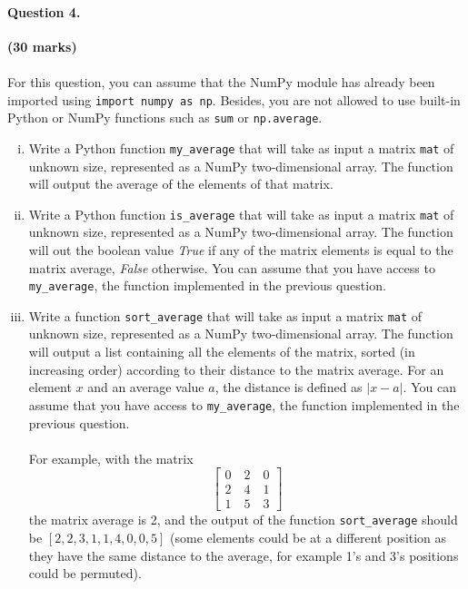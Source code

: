 \documentclass[12pt]{article}
\begin{document}
\paragraph{Question 4. }\hfill {\bf (30 marks)}\\\\
For this question, you can assume that the NumPy module has already been imported using \verb|import numpy as np|. Besides, you are not allowed to use built-in Python or NumPy functions such as \verb|sum| or \verb|np.average|.
\begin{enumerate}[(i)]
\item Write a Python function \verb|my_average| that will take as input a matrix \verb|mat| of unknown size, represented as a NumPy two-dimensional array. The function will output the average of the elements of that matrix.
\item Write a Python function \verb|is_average| that will take as input a matrix \verb|mat| of unknown size, represented as a NumPy two-dimensional array. The function will out the boolean value \textit{True} if any of the matrix elements is equal to the matrix average, \textit{False} otherwise. You can assume that you have access to \verb|my_average|, the function implemented in the previous question.
\item Write a function \verb|sort_average| that will take as input a matrix \verb|mat| of unknown size, represented as a NumPy two-dimensional array. The function will output a list containing all the elements of the matrix, sorted (in increasing order) according to their distance to the matrix average. For an element $x$ and an average value $a$, the distance is defined as $|x-a|$. You can assume that you have access to \verb|my_average|, the function implemented in the previous question.\\\\For example, with the matrix
\[\begin{bmatrix}
 0\quad 2\quad 0\\2\quad 4\quad 1\\1\quad 5\quad 3\end{bmatrix}\]
 the matrix average is 2, and the output of the function \verb|sort_average| should be $[2,2,3,1,1,4,0,0,5]$ (some elements could be at a different position as they have the same distance to the average, for example 1's and 3's positions could be permuted).
\end{enumerate}
\end{document}
